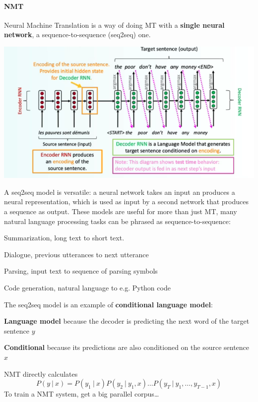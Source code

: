 \documentclass[10pt]{report}
\begin{document}
\paragraph{NMT} Neural Machine Translation is a way of doing MT with a \textbf{single neural network}, a sequence-to-sequence (seq2seq) one.\begin{center}
	\includegraphics[scale=0.6]{63.png}
\end{center}
A seq2seq model is versatile: a neural network takes an input an produces a neural representation, which is used as input by a second network that produces a sequence as output. These models are useful for more than just MT, many natural language processing tasks can be phrased as sequence-to-sequence:
\begin{list}{}{}
	\item Summarization, long text to short text.
	\item Dialogue, previous utterances to next utterance
	\item Parsing, input text to sequence of parsing symbols
	\item Code generation, natural language to e.g. Python code
\end{list}
The seq2seq model is an example of \textbf{conditional language model}:\begin{list}{}{}
	\item \textbf{Language model} because the decoder is predicting the next word of the target sentence $y$
	\item \textbf{Conditional} because its predictions are also conditioned on the source sentence $x$
\end{list}
NMT directly calculates $$P(y\:|\:x) = P(y_1\:|\:x)P(y_2\:|\:y_1,x)\ldots P(y_T\:|\:y_1,\ldots,y_{T-1},x)$$
To train a NMT system, get a big parallel corpus\ldots
\end{document}
